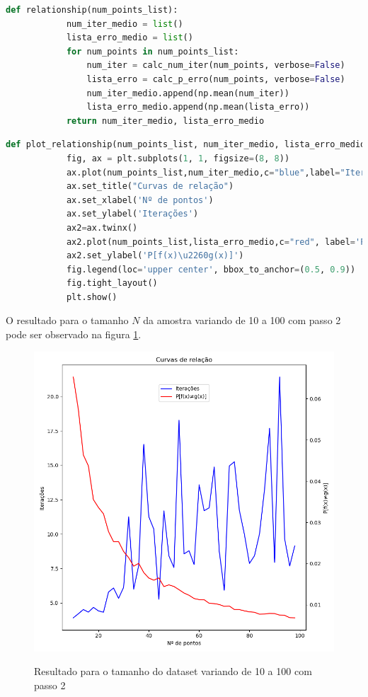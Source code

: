 \begin{enumerate}
    \begin{lstlisting}[language=Python, caption=Cálculo da probabilidade de erro e do número de iterações, label=cod:perceptron_relationship]
        def relationship(num_points_list):
            num_iter_medio = list()
            lista_erro_medio = list()
            for num_points in num_points_list:
                num_iter = calc_num_iter(num_points, verbose=False)
                lista_erro = calc_p_erro(num_points, verbose=False)
                num_iter_medio.append(np.mean(num_iter))  
                lista_erro_medio.append(np.mean(lista_erro))
            return num_iter_medio, lista_erro_medio
    \end{lstlisting}

    \begin{lstlisting}[language=Python, caption=Plot da probabilidade de erro e do número de iterações, label=cod:perceptron_relationship_plot]
        def plot_relationship(num_points_list, num_iter_medio, lista_erro_medio):
            fig, ax = plt.subplots(1, 1, figsize=(8, 8))
            ax.plot(num_points_list,num_iter_medio,c="blue",label="Iterações")
            ax.set_title("Curvas de relação")
            ax.set_xlabel('Nº de pontos')
            ax.set_ylabel('Iterações')
            ax2=ax.twinx()
            ax2.plot(num_points_list,lista_erro_medio,c="red", label='P[f(x)\u2260g(x)]')
            ax2.set_ylabel('P[f(x)\u2260g(x)]')
            fig.legend(loc='upper center', bbox_to_anchor=(0.5, 0.9))
            fig.tight_layout()
            plt.show()
    \end{lstlisting}

    O resultado para o tamanho $N$ da amostra variando de 10 a 100 com passo 2 pode ser observado na figura \ref{fig:perceptron_relationship_plot}. 

    \begin{figure}[H]
        \caption{Resultado para o tamanho do dataset variando de 10 a 100 com passo 2}
           \centering
           \includegraphics[width=12cm]{perceptron_relationship_plot.png}
        \label{fig:perceptron_relationship_plot}
    \end{figure}


\end{enumerate}
